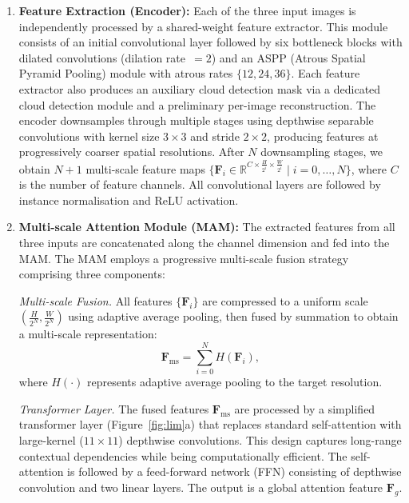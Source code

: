 \documentclass[12pt,a4paper]{article}
\begin{document}
\begin{enumerate}[leftmargin=2em]
    \item \textbf{Feature Extraction (Encoder):} Each of the three input images is independently processed by a shared-weight feature extractor. This module consists of an initial convolutional layer followed by six bottleneck blocks with dilated convolutions (dilation rate~$= 2$) and an ASPP (Atrous Spatial Pyramid Pooling) module with atrous rates $\{12, 24, 36\}$. Each feature extractor also produces an auxiliary cloud detection mask via a dedicated cloud detection module and a preliminary per-image reconstruction. The encoder downsamples through multiple stages using depthwise separable convolutions with kernel size $3 \times 3$ and stride $2 \times 2$, producing features at progressively coarser spatial resolutions. After $N$ downsampling stages, we obtain $N+1$ multi-scale feature maps $\{\mathbf{F}_i \in \mathbb{R}^{C \times \frac{H}{2^i} \times \frac{W}{2^i}} \mid i = 0, \ldots, N\}$, where $C$ is the number of feature channels. All convolutional layers are followed by instance normalisation and ReLU activation.
    
    \item \textbf{Multi-scale Attention Module (MAM):} The extracted features from all three inputs are concatenated along the channel dimension and fed into the MAM. The MAM employs a progressive multi-scale fusion strategy comprising three components:
    
    \textit{Multi-scale Fusion.} All features $\{\mathbf{F}_i\}$ are compressed to a uniform scale $(\frac{H}{2^N}, \frac{W}{2^N})$ using adaptive average pooling, then fused by summation to obtain a multi-scale representation:
    \begin{equation}
        \mathbf{F}_{\text{ms}} = \sum_{i=0}^{N} H(\mathbf{F}_i),
    \end{equation}
    where $H(\cdot)$ represents adaptive average pooling to the target resolution.
    
    \textit{Transformer Layer.} The fused features $\mathbf{F}_{\text{ms}}$ are processed by a simplified transformer layer (Figure~\ref{fig:lim}a) that replaces standard self-attention with large-kernel ($11\times11$) depthwise convolutions. This design captures long-range contextual dependencies while being computationally efficient. The self-attention is followed by a feed-forward network (FFN) consisting of depthwise convolution and two linear layers. The output is a global attention feature $\mathbf{F}_g$.
    

\end{enumerate}
\end{document}
